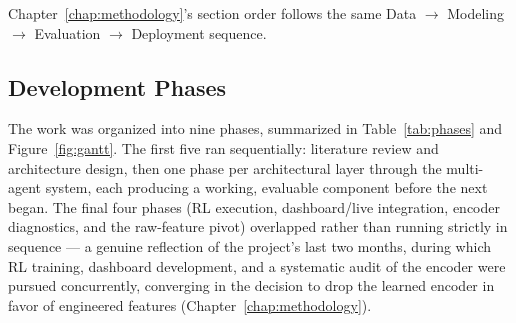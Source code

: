 Chapter~\ref{chap:methodology}'s section order follows the same Data $\to$ Modeling $\to$ Evaluation $\to$ Deployment sequence.

\subsection{Development Phases}
\label{subsec:development-phases}

The work was organized into nine phases, summarized in Table~\ref{tab:phases} and Figure~\ref{fig:gantt}. The first five ran sequentially: literature review and architecture design, then one phase per architectural layer through the multi-agent system, each producing a working, evaluable component before the next began. The final four phases (RL execution, dashboard/live integration, encoder diagnostics, and the raw-feature pivot) overlapped rather than running strictly in sequence --- a genuine reflection of the project's last two months, during which RL training, dashboard development, and a systematic audit of the encoder were pursued concurrently, converging in the decision to drop the learned encoder in favor of engineered features (Chapter~\ref{chap:methodology}).


